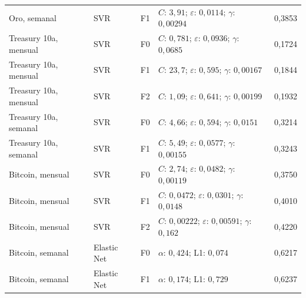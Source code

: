 \begin{longtable}{@{}lllp{}r@{}}
Oro, semanal & SVR & F1 & $C$: $3{,}91$; $\varepsilon$: $0{,}0114$; $\gamma$: $0{,}00294$ & 0,3853 \\
Treasury 10a, mensual & SVR & F0 & $C$: $0{,}781$; $\varepsilon$: $0{,}0936$; $\gamma$: $0{,}0685$ & 0,1724 \\
Treasury 10a, mensual & SVR & F1 & $C$: $23{,}7$; $\varepsilon$: $0{,}595$; $\gamma$: $0{,}00167$ & 0,1844 \\
Treasury 10a, mensual & SVR & F2 & $C$: $1{,}09$; $\varepsilon$: $0{,}641$; $\gamma$: $0{,}00199$ & 0,1932 \\
Treasury 10a, semanal & SVR & F0 & $C$: $4{,}66$; $\varepsilon$: $0{,}594$; $\gamma$: $0{,}0151$ & 0,3214 \\
Treasury 10a, semanal & SVR & F1 & $C$: $5{,}49$; $\varepsilon$: $0{,}0577$; $\gamma$: $0{,}00155$ & 0,3243 \\
Bitcoin, mensual & SVR & F0 & $C$: $2{,}74$; $\varepsilon$: $0{,}0482$; $\gamma$: $0{,}00119$ & 0,3750 \\
Bitcoin, mensual & SVR & F1 & $C$: $0{,}0472$; $\varepsilon$: $0{,}0301$; $\gamma$: $0{,}0148$ & 0,4010 \\
Bitcoin, mensual & SVR & F2 & $C$: $0{,}00222$; $\varepsilon$: $0{,}00591$; $\gamma$: $0{,}162$ & 0,4220 \\
Bitcoin, semanal & Elastic Net & F0 & $\alpha$: $0{,}424$; L1: $0{,}074$ & 0,6217 \\
Bitcoin, semanal & Elastic Net & F1 & $\alpha$: $0{,}174$; L1: $0{,}729$ & 0,6237 \\
\bottomrule
\end{longtable}
